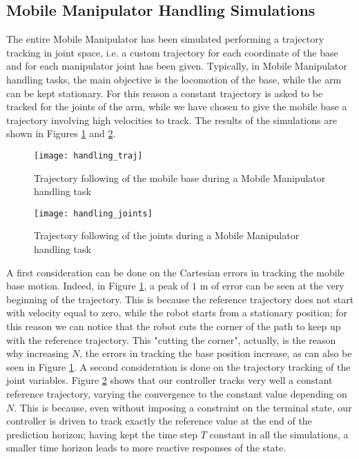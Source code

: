 \subsection{Mobile Manipulator Handling Simulations}
The entire Mobile Manipulator has been simulated performing a trajectory tracking in joint space, i.e. a custom trajectory for each coordinate of the base and for each manipulator joint has been given. Typically, in Mobile Manipulator handling tasks, the main objective is the locomotion of the base, while the arm can be kept stationary. For this reason a constant trajectory is asked to be tracked for the joints of the arm, while we have chosen to give the mobile base a trajectory involving high velocities to track. The results of the simulations are shown in Figures \ref{handling_traj} and \ref{handling_joints}. 
\begin{figure}[p]
	\centering
	\texttt{[image: handling\_traj]}
	\caption{Trajectory following of the mobile base during a Mobile Manipulator handling task}
	\label{handling_traj}
\end{figure}
\begin{figure}[p]
	\centering
	\texttt{[image: handling\_joints]}
	\caption{Trajectory following of the joints during a Mobile Manipulator handling task}
	\label{handling_joints}
\end{figure}
A first consideration can be done on the Cartesian errors in tracking the mobile base motion. Indeed, in Figure \ref{handling_traj}, a peak of $1$ m of error can be seen at the very beginning of the trajectory. This is because the reference trajectory does not start with velocity equal to zero, while the robot starts from a stationary position; for this reason we can notice that the robot cuts the corner of the path to keep up with the reference trajectory. This "cutting the corner", actually, is the reason why increasing $N$, the errors in tracking the base position increase, as can also be seen in Figure \ref{handling_traj}. A second consideration is done on the trajectory tracking of the joint variables. Figure \ref{handling_joints} shows that our controller tracks very well a constant reference trajectory, varying the convergence to the constant value depending on $N$. This is because, even without imposing a constraint on the terminal state, our controller is driven to track exactly the reference value at the end of the prediction horizon; having kept the time step $T$ constant in all the simulations, a smaller time horizon leads to more reactive responses of the state.

